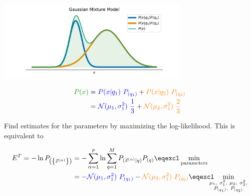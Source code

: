 \begin{frame} 

\pause

\begin{center}
	\includegraphics[width=0.7\textwidth]{img/gmm}
	\label{fig:gmmexample}
\end{center}

\pause


\svspace{-11mm}

\begin{align}
{\color{darkgreen}P(x)} &= {\color{blue}P(x|q_1)~P_{(q_1)}} + {\color{orange}P(x|q_2)~P_{(q_2)}}\\
&= {\color{blue}\mathcal{N}(\mu_1, \sigma^2_1)~\frac{1}{3}} + {\color{orange}\mathcal{N}(\mu_2, \sigma^2_1)~\frac{2}{3}}
\end{align}

\pause

Find estimates for the parameters by maximizing the log-likelihood. This is equivalent to

\svspace{-7mm}

\begin{align}
E^T = - \ln P_{\left( \left\{ \vec{x}^{(\alpha)} \right\} \right)} &= - \sum_{\alpha=1}^{p} \ln \sum_{q=1}^{M} P_{(\vec{x}^{(\alpha)} | q)} P_{(q)} \eqexcl \min_{\text{parameters}}\\
&= - {\color{blue}\mathcal{N}(\mu_1, \sigma^2_1)~P_{(q_1)}} - {\color{orange}\mathcal{N}(\mu_2, \sigma^2_1)~P_{(q_2)}}
\eqexcl
\kern-2ex
\min_{\substack{
\mu_1,~\sigma^2_1,~\mu_2,~\sigma^2_2,\\ P_{(q_1)},~P_{(q_2)}}}
\end{align}

\end{frame}

